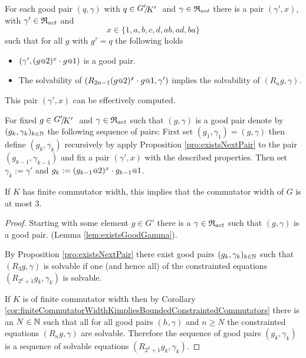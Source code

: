 \documentclass[a4paper,12pt]{article}
\begin{document}
\begin{pro}\label{pro:existsNextPair}
 For each good pair $(q,\gamma)$ with $q\in\RNK{G'}{K'}$ and $\gamma\in\mathfrak{R}_{act}$ there
 is a pair $(\gamma',x)$, with $\gamma'\in\mathfrak{R}_{act}$ and 
 \[x\in \{1,a,b,c,d,ab,ad,ba\}\] 
 such that for all $g$ with $g^\tau =q$ the following holds
 \begin{itemize}
  \item $(\gamma',(g\at{2})^x \cdot g\at{1})$ is a good pair.
  \item The solvability of $(R_{2n-1} (g\at{2})^x \cdot g\at{1},\gamma')$ implies
  the solvability of $(R_ng,\gamma)$.
 \end{itemize}
 This pair $(\gamma',x)$ can be effectively computed. 
\end{pro}
 For fixed $g\in\RNK{G'}{K'}$ and $\gamma\in \mathfrak{R}_{act}$ such that $(g,\gamma)$ is a good pair
 denote by $(g_k,\gamma_k)_{k\in\mathbb{N}}$ the following sequence of pairs:
 First set $(g_1,\gamma_1)=(g,\gamma)$ then define $(g_k,\gamma_k)$ recursively by apply Proposition \ref{pro:existsNextPair}
 to the pair $(g_{k-1},\gamma_{k-1})$ and fix a pair $(\gamma',x)$ with the described properties.
 Then set $\gamma_k := \gamma'$ and $g_k:=(g_{k-1}\at{2})^{x} \cdot g_{k-1}\at{1}$.
 
 \begin{cor} \label{cor:finiteCommutatorWidthKimpliesCommutatorWidth3} 
 If $K$ has finite commutator width, this implies that the commutator width of $G$ 
 is at most $3$.
\end{cor}
\begin{proof}
 Starting with some element $g\in G'$ there is a $\gamma\in\mathfrak{R}_{act}$ such that
 $(g,\gamma)$ is a good pair. (Lemma \ref{lem:existsGoodGamma}).
 
 By Proposition \ref{pro:existsNextPair} there exist good pairs $(g_k,\gamma_k)_{k\in\mathbb{N}}$ such 
 that $(R_3g,\gamma)$ is solvable if one (and hence all) of the constrainted equations $(R_{2^k+1}g_k,\gamma_k)$ is solvable.
 
 If $K$ is of finite commutator width then by Corollary \ref{cor:finiteCommutatorWidthKimpliesBoundedConstraintedCommutators} 
 there is an $N\in\mathbb{N}$ such that all for all good pairs $(h,\gamma)$ and $n\geq N$ the constrainted equations $(R_ng,\gamma)$ are solvable.
 Therefore the sequence of good pairs $(g_k,\gamma_k)$ is a sequence of solvable equations $(R_{2^k+1}g_k,\gamma_k)$.
 \end{proof}
 
\end{document}
